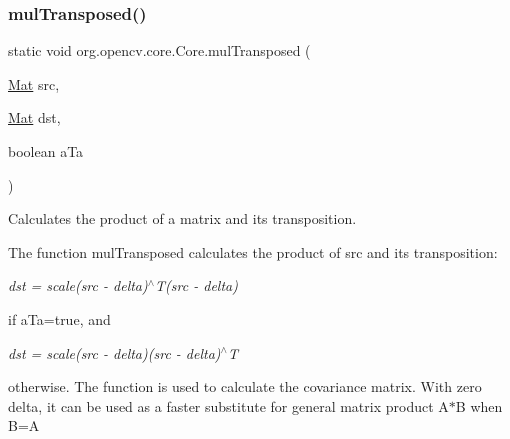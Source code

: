 \subsubsection{\texorpdfstring{mul\+Transposed()}{mulTransposed()}\hspace{0.1cm}{\footnotesize\ttfamily [3/3]}}
{\footnotesize\ttfamily static void org.\+opencv.\+core.\+Core.\+mul\+Transposed (\begin{DoxyParamCaption}\item[{\mbox{\hyperlink{classorg_1_1opencv_1_1core_1_1_mat}{Mat}}}]{src,  }\item[{\mbox{\hyperlink{classorg_1_1opencv_1_1core_1_1_mat}{Mat}}}]{dst,  }\item[{boolean}]{a\+Ta }\end{DoxyParamCaption})\hspace{0.3cm}{\ttfamily [static]}}

Calculates the product of a matrix and its transposition.

The function {\ttfamily mul\+Transposed} calculates the product of {\ttfamily src} and its transposition\+:

{\itshape dst = scale(src -\/ delta)$^\wedge$T(src -\/ delta)}

if {\ttfamily a\+Ta=true}, and

{\itshape dst = scale(src -\/ delta)(src -\/ delta)$^\wedge$T}

otherwise. The function is used to calculate the covariance matrix. With zero delta, it can be used as a faster substitute for general matrix product {\ttfamily A$\ast$B} when {\ttfamily B=A\textquotesingle{}}


